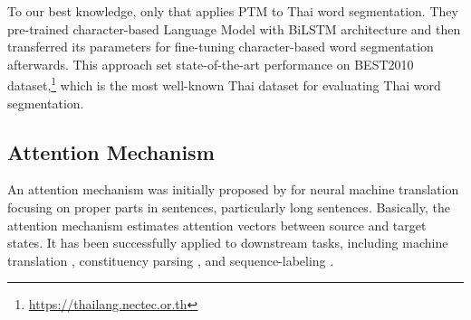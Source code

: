 To our best knowledge, only  that applies PTM to Thai word segmentation. 
%
They pre-trained character-based Language Model with BiLSTM architecture and then transferred its parameters for fine-tuning character-based word segmentation afterwards. 
%
This approach set state-of-the-art performance on BEST2010 dataset,\footnote{\url{https://thailang.nectec.or.th}} which is the most well-known Thai dataset for evaluating Thai word segmentation.

\subsection{Attention Mechanism}
An attention mechanism was initially proposed by  for neural machine translation focusing on proper parts in sentences, particularly long sentences. 
%
Basically, the attention mechanism estimates attention vectors between source and target states.
%
It has been successfully applied to downstream tasks, including machine translation \cite{luong-etal-2015-effective,Vaswani2017}, constituency parsing \cite{kitaev-klein-2018-constituency}, and sequence-labeling \cite{higashiyama-etal-2019-incorporating,tian-etal-2020-joint-chinese}.
%
